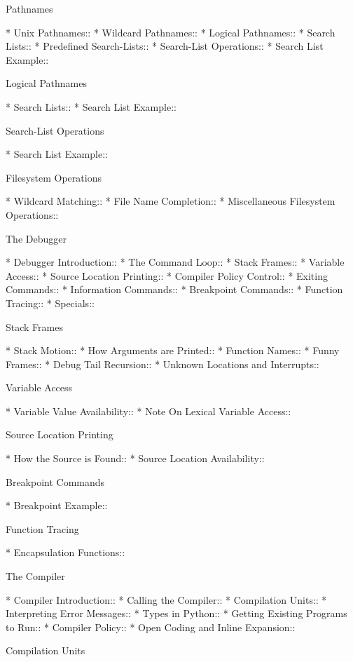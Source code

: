 \begin{menu}
Pathnames

* Unix Pathnames::              
* Wildcard Pathnames::          
* Logical Pathnames::           
* Search Lists::                
* Predefined Search-Lists::     
* Search-List Operations::      
* Search List Example::         

Logical Pathnames

* Search Lists::
* Search List Example::

Search-List Operations

* Search List Example::         

Filesystem Operations

* Wildcard Matching::           
* File Name Completion::        
* Miscellaneous Filesystem Operations::  

The Debugger

* Debugger Introduction::       
* The Command Loop::            
* Stack Frames::                
* Variable Access::             
* Source Location Printing::    
* Compiler Policy Control::     
* Exiting Commands::            
* Information Commands::        
* Breakpoint Commands::         
* Function Tracing::            
* Specials::                    

Stack Frames

* Stack Motion::                
* How Arguments are Printed::   
* Function Names::              
* Funny Frames::                
* Debug Tail Recursion::        
* Unknown Locations and Interrupts::  

Variable Access

* Variable Value Availability::  
* Note On Lexical Variable Access::  

Source Location Printing

* How the Source is Found::     
* Source Location Availability::  

Breakpoint Commands

* Breakpoint Example::          

Function Tracing

* Encapsulation Functions::     

The Compiler

* Compiler Introduction::       
* Calling the Compiler::        
* Compilation Units::           
* Interpreting Error Messages::  
* Types in Python::             
* Getting Existing Programs to Run::  
* Compiler Policy::             
* Open Coding and Inline Expansion::  

Compilation Units


\end{menu}
